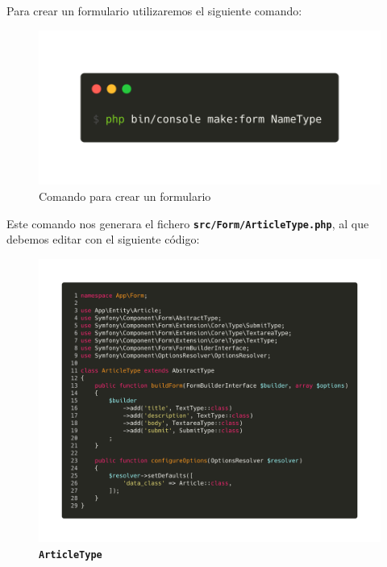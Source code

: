 Para crear un formulario utilizaremos el siguiente comando:

\begin{figure}[ht]
  \centering
  \includegraphics[width=\textwidth]{../assets/make_form.png}
  \caption{Comando para crear un formulario}
  \label{fig:make_form}
\end{figure}

\clearpage
Este comando nos generara el fichero \texttt{\textbf{src/Form/ArticleType.php}}, al que debemos editar con el siguiente código:

\begin{figure}[ht]
  \centering
  \includegraphics[width=\textwidth]{../assets/article_type.png}
  \caption{\texttt{\textbf{ArticleType}}}
  \label{fig:article_type}
\end{figure}

